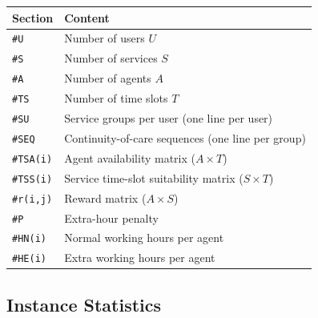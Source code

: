 \documentclass[11pt,a4paper]{article}
\begin{document}
\begin{center}
\small
\begin{tabular}{ll}
\toprule
\textbf{Section} & \textbf{Content} \\
\midrule
\texttt{\#U}       & Number of users $U$ \\
\texttt{\#S}       & Number of services $S$ \\
\texttt{\#A}       & Number of agents $A$ \\
\texttt{\#TS}      & Number of time slots $T$ \\
\texttt{\#SU}      & Service groups per user (one line per user) \\
\texttt{\#SEQ}     & Continuity-of-care sequences (one line per group) \\
\texttt{\#TSA(i)}  & Agent availability matrix ($A \times T$) \\
\texttt{\#TSS(i)}  & Service time-slot suitability matrix ($S \times T$) \\
\texttt{\#r(i,j)}  & Reward matrix ($A \times S$) \\
\texttt{\#P}       & Extra-hour penalty \\
\texttt{\#HN(i)}   & Normal working hours per agent \\
\texttt{\#HE(i)}   & Extra working hours per agent \\
\bottomrule
\end{tabular}
\end{center}

\subsection{Instance Statistics}
\end{document}
